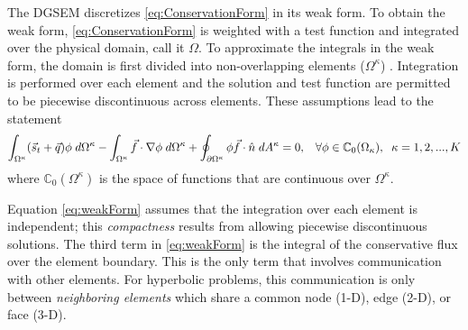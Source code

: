 \documentclass[12pt]{softwaremanual}
\begin{document}
The DGSEM discretizes \eqref{eq:ConservationForm} in its weak form. To obtain the weak form, \eqref{eq:ConservationForm} is weighted with a test function and integrated over the physical domain, call it $\Omega$. To approximate the integrals in the weak form, the domain is first divided into non-overlapping elements  ($\Omega^\kappa$) . Integration is performed over each element and the solution and test function are permitted to be piecewise discontinuous across elements. These assumptions lead to the statement
  \begin{equation}
  \int_{\Omega^\kappa} (\vec{s}_t + \vec{q} )\phi \hspace{1mm} d\Omega^\kappa  - \int_{\Omega^\kappa} \vec{f} \cdot \nabla \phi \hspace{1mm} d\Omega^\kappa + \oint_{\partial \Omega^\kappa} \phi \vec{f}\cdot \hat{n} \hspace{1mm} d A^\kappa = 0, \hspace{3mm} \forall \phi \in \mathbb{C}_0(\Omega_\kappa), \hspace{2mm} \kappa=1,2,...,K \label{eq:weakForm}
  \end{equation}
where $\mathbb{C}_0(\Omega^\kappa)$ is the space of functions that are continuous over $\Omega^\kappa$.

Equation \eqref{eq:weakForm} assumes that the integration over each element is independent; this \textit{compactness} results from allowing piecewise discontinuous solutions. The third term in \eqref{eq:weakForm} is the integral of the conservative flux over the element boundary. This is the only term that involves communication with other elements. For hyperbolic problems, this communication is only between \textit{neighboring elements} which share a common node (1-D), edge (2-D), or face (3-D).
\end{document}

